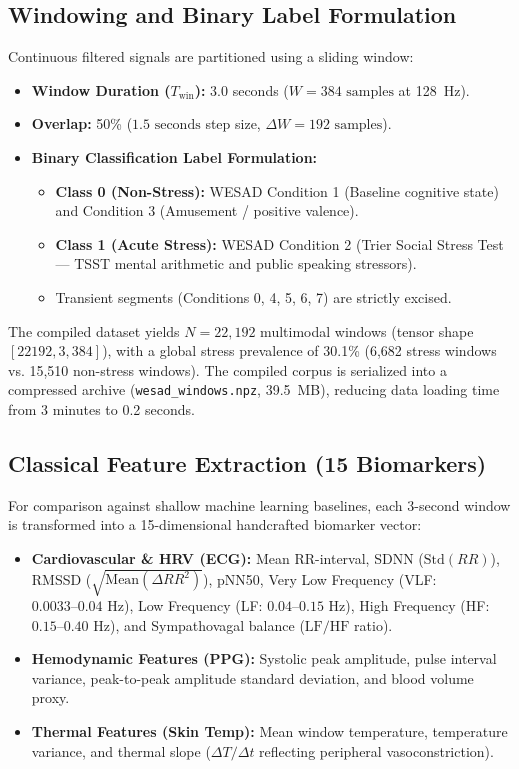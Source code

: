 \documentclass[conference]{IEEEtran}
\begin{document}
\subsection{Windowing and Binary Label Formulation}
Continuous filtered signals are partitioned using a sliding window:
\begin{itemize}
    \item \textbf{Window Duration ($T_{\text{win}}$):} 3.0 seconds ($W = 384\text{ samples}$ at 128~Hz).
    \item \textbf{Overlap:} 50\% ($1.5\text{ seconds}$ step size, $\Delta W = 192\text{ samples}$).
    \item \textbf{Binary Classification Label Formulation:}
    \begin{itemize}
        \item \textbf{Class 0 (Non-Stress):} WESAD Condition 1 (Baseline cognitive state) and Condition 3 (Amusement / positive valence).
        \item \textbf{Class 1 (Acute Stress):} WESAD Condition 2 (Trier Social Stress Test --- TSST mental arithmetic and public speaking stressors).
        \item Transient segments (Conditions 0, 4, 5, 6, 7) are strictly excised.
    \end{itemize}
\end{itemize}

The compiled dataset yields $N = 22,192$ multimodal windows (tensor shape $[22192, 3, 384]$), with a global stress prevalence of 30.1\% (6,682 stress windows vs. 15,510 non-stress windows). The compiled corpus is serialized into a compressed archive (\texttt{wesad\_windows.npz}, 39.5~MB), reducing data loading time from 3 minutes to 0.2 seconds.

\subsection{Classical Feature Extraction (15 Biomarkers)}
For comparison against shallow machine learning baselines, each 3-second window is transformed into a 15-dimensional handcrafted biomarker vector:
\begin{itemize}
    \item \textbf{Cardiovascular \& HRV (ECG):} Mean RR-interval, SDNN ($\text{Std}(RR)$), RMSSD ($\sqrt{\text{Mean}(\Delta RR^2)}$), pNN50, Very Low Frequency (VLF: $0.0033–0.04\text{ Hz}$), Low Frequency (LF: $0.04–0.15\text{ Hz}$), High Frequency (HF: $0.15–0.40\text{ Hz}$), and Sympathovagal balance ($\text{LF}/\text{HF}$ ratio).
    \item \textbf{Hemodynamic Features (PPG):} Systolic peak amplitude, pulse interval variance, peak-to-peak amplitude standard deviation, and blood volume proxy.
    \item \textbf{Thermal Features (Skin Temp):} Mean window temperature, temperature variance, and thermal slope ($\Delta T / \Delta t$ reflecting peripheral vasoconstriction).
\end{itemize}
\end{document}
